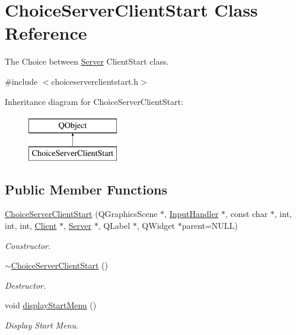 \hypertarget{classChoiceServerClientStart}{\section{Choice\-Server\-Client\-Start Class Reference}
\label{classChoiceServerClientStart}
}


The Choice between \hyperlink{classServer}{Server} Client\-Start class.  




{\ttfamily \#include $<$choiceserverclientstart.\-h$>$}

Inheritance diagram for Choice\-Server\-Client\-Start\-:\begin{figure}[H]
\begin{center}
\leavevmode
\includegraphics[height=2.000000cm]{classChoiceServerClientStart}
\end{center}
\end{figure}
\subsection*{Public Member Functions}
\begin{DoxyCompactItemize}
\item 
\hyperlink{classChoiceServerClientStart_aed01cdd365bf5bdd25d124e9cf53b4c2}{Choice\-Server\-Client\-Start} (Q\-Graphics\-Scene $\ast$, \hyperlink{classInputHandler}{Input\-Handler} $\ast$, const char $\ast$, int, int, int, \hyperlink{classClient}{Client} $\ast$, \hyperlink{classServer}{Server} $\ast$, Q\-Label $\ast$, Q\-Widget $\ast$parent=N\-U\-L\-L)
\begin{DoxyCompactList}\small\item\em Constructor. \end{DoxyCompactList}\item 
\hypertarget{classChoiceServerClientStart_a26594a0283a1d48b839d8d7bcd578b91}{\hyperlink{classChoiceServerClientStart_a26594a0283a1d48b839d8d7bcd578b91}{$\sim$\-Choice\-Server\-Client\-Start} ()}\label{classChoiceServerClientStart_a26594a0283a1d48b839d8d7bcd578b91}

\begin{DoxyCompactList}\small\item\em Destructor. \end{DoxyCompactList}\item 
\hypertarget{classChoiceServerClientStart_ad23b654ec5ad197c27f45514d57cb8bf}{void \hyperlink{classChoiceServerClientStart_ad23b654ec5ad197c27f45514d57cb8bf}{display\-Start\-Menu} ()}\label{classChoiceServerClientStart_ad23b654ec5ad197c27f45514d57cb8bf}

\begin{DoxyCompactList}\small\item\em Display Start Menu. \end{DoxyCompactList}\end{DoxyCompactItemize}


